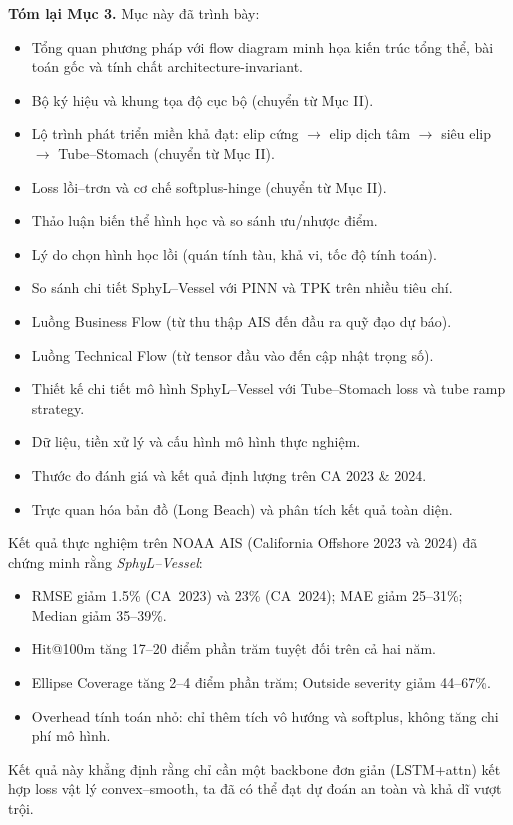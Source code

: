 \documentclass{IEEEtran}
\begin{document}
\medskip
\noindent\textbf{Tóm lại Mục 3.}
Mục này đã trình bày:
\begin{itemize}
  \item Tổng quan phương pháp với flow diagram minh họa kiến trúc tổng thể,
        bài toán gốc và tính chất architecture-invariant.
  \item Bộ ký hiệu và khung tọa độ cục bộ (chuyển từ Mục II).
  \item Lộ trình phát triển miền khả đạt: elip cứng $\to$ elip dịch tâm
        $\to$ siêu elip $\to$ Tube--Stomach (chuyển từ Mục II).
  \item Loss lồi--trơn và cơ chế softplus-hinge (chuyển từ Mục II).
  \item Thảo luận biến thể hình học và so sánh ưu/nhược điểm.
  \item Lý do chọn hình học lồi (quán tính tàu, khả vi, tốc độ tính toán).
  \item So sánh chi tiết SphyL--Vessel với PINN và TPK trên nhiều tiêu chí.
  \item Luồng Business Flow (từ thu thập AIS đến đầu ra quỹ đạo dự báo).
  \item Luồng Technical Flow (từ tensor đầu vào đến cập nhật trọng số).
  \item Thiết kế chi tiết mô hình SphyL--Vessel với Tube--Stomach loss
        và tube ramp strategy.
  \item Dữ liệu, tiền xử lý và cấu hình mô hình thực nghiệm.
  \item Thước đo đánh giá và kết quả định lượng trên CA 2023 \& 2024.
  \item Trực quan hóa bản đồ (Long Beach) và phân tích kết quả toàn diện.
\end{itemize}

Kết quả thực nghiệm trên NOAA AIS (California Offshore 2023 và 2024)
đã chứng minh rằng \emph{SphyL--Vessel}:
\begin{itemize}
  \item RMSE giảm 1.5\% (CA~2023) và 23\% (CA~2024);
        MAE giảm 25--31\%; Median giảm 35--39\%.
  \item Hit@100m tăng 17--20 điểm phần trăm tuyệt đối trên cả hai năm.
  \item Ellipse Coverage tăng 2--4 điểm phần trăm;
        Outside severity giảm 44--67\%.
  \item Overhead tính toán nhỏ: chỉ thêm tích vô hướng và softplus,
        không tăng chi phí mô hình.
\end{itemize}

Kết quả này khẳng định rằng chỉ cần một backbone đơn giản (LSTM+attn)
kết hợp loss vật lý convex--smooth,
ta đã có thể đạt dự đoán an toàn và khả dĩ vượt trội.
\end{document}
